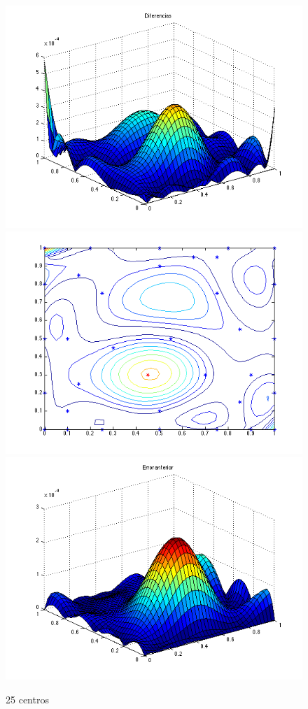 \documentclass[11pt,a4paper]{article}
\begin{document}
\begin{figure}[H]
\centering

\includegraphics[scale=0.35]{diferencias35.png}
\includegraphics[scale=0.35]{centros35.png}
\includegraphics[scale=0.35]{error35.png}
\caption{25 centros}
\end{figure}
\end{document}
